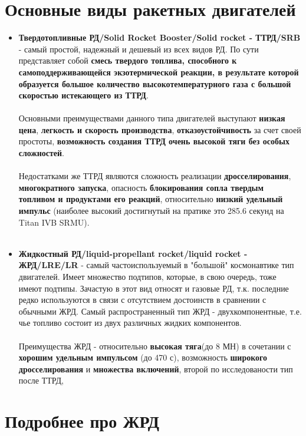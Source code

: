 \documentclass{article}
\begin{document}
\section{Основные виды ракетных двигателей}
\begin{itemize}
    \item \textbf{Твердотопливные РД/Solid Rocket Booster/Solid rocket - ТТРД/SRB} - самый простой, надежный и дешевый из всех видов РД. По сути представляет собой  \textbf{смесь твердого топлива, способного к самоподдерживающейся экзотермической реакции, в результате которой образуется большое количество высокотемпературного газа с большой скоростью истекающего из ТТРД}. \\ \\
    Основными преимуществами данного типа двигателей выступают  \textbf{низкая цена},  \textbf{легкость и скорость производства},  \textbf{отказоустойчивость} за счет своей простоты,  \textbf{возможность создания ТТРД очень высокой тяги без особых сложностей}. \\ \\
    Недостатками же ТТРД являются сложность реализации  \textbf{дросселирования},  \textbf{многократного запуска}, опасность  \textbf{блокирования сопла твердым топливом и продуктами его реакций}, относительно  \textbf{низкий удельный импульс} (наиболее высокий достигнутый на пратике это 285.6 секунд на Titan IVB SRMU). \\ \\
    \item  \textbf{Жидкостный РД/liquid-propellant rocket/liquid rocket - ЖРД/LRE/LR} - самый частоиспользуемый в "большой" космонавтике тип двигателей. Имеет множество подтипов, которые, в свою очередь, тоже имеют подтипы. Зачастую в этот вид относят и газовые РД, т.к. последние редко используются в связи с отсутствием достоинств в сравнении с обычными ЖРД. Самый распространенный тип ЖРД - двухкомпонентные, т.е. чье топливо состоит из двух различных жидких компонентов. \\ \\
    Преимущества ЖРД - относительно \textbf{высокая тяга}(до 8 МН) в сочетании с \textbf{хорошим удельным импульсом} (до 470 с), возможность \textbf{широкого дросселирования} и \textbf{множества включений}, второй по исследованости тип после ТТРД,
\end{itemize}

\section{Подробнее про ЖРД}
\end{document}
